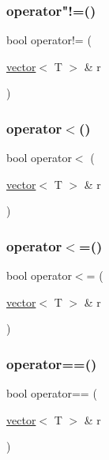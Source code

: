\mbox{\label{classvector_affc26876345a2e9ffb125b311a59486a}} 
\subsubsection{\texorpdfstring{operator"!=()}{operator!=()}}
{\footnotesize\ttfamily bool operator!= (\begin{DoxyParamCaption}\item[{\mbox{\hyperlink{classvector}{vector}}$<$ T $>$ \&}]{r }\end{DoxyParamCaption})}

\mbox{\label{classvector_a4d9feb82d6dff052f9ed6239aa8e76f4}} 
\subsubsection{\texorpdfstring{operator$<$()}{operator<()}}
{\footnotesize\ttfamily bool operator$<$ (\begin{DoxyParamCaption}\item[{\mbox{\hyperlink{classvector}{vector}}$<$ T $>$ \&}]{r }\end{DoxyParamCaption})}

\mbox{\label{classvector_ad4e5e30ba92e0510c8f5d1bfa52675f4}} 
\subsubsection{\texorpdfstring{operator$<$=()}{operator<=()}}
{\footnotesize\ttfamily bool operator$<$= (\begin{DoxyParamCaption}\item[{\mbox{\hyperlink{classvector}{vector}}$<$ T $>$ \&}]{r }\end{DoxyParamCaption})}

\mbox{\label{classvector_a37d87b3a77611d3293bdf0cc0cd70686}} 
\subsubsection{\texorpdfstring{operator==()}{operator==()}}
{\footnotesize\ttfamily bool operator== (\begin{DoxyParamCaption}\item[{\mbox{\hyperlink{classvector}{vector}}$<$ T $>$ \&}]{r }\end{DoxyParamCaption})}

